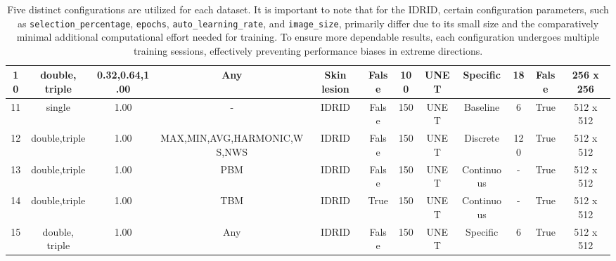\begin{table}[H]
{\begin{tabular}{|c|c|c|c|c|c|c|c|c|c|c|c|}
  10 & double, triple & 0.32,0.64,1.00 & Any                         & Skin lesion & False & 100 & UNET & Specific   & 18  & False & 256 x 256 \\ \hline
  11 & single         & 1.00           & -                           & IDRID       & False & 150 & UNET & Baseline   & 6   & True  & 512 x 512 \\ \hline
  12 & double,triple  & 1.00           & MAX,MIN,AVG,HARMONIC,WS,NWS & IDRID       & False & 150 & UNET & Discrete   & 120 & True  & 512 x 512 \\ \hline
  13 & double,triple  & 1.00           & PBM                         & IDRID       & False & 150 & UNET & Continuous & -   & True  & 512 x 512 \\ \hline
  14 & double,triple  & 1.00           & TBM                         & IDRID       & True  & 150 & UNET & Continuous & -   & True  & 512 x 512 \\ \hline
  15 & double, triple & 1.00           & Any                         & IDRID       & False & 150 & UNET & Specific   & 6   & True  & 512 x 512 \\ \hline
  \end{tabular}%
  }
  \caption[Final Configuration List]{Five distinct configurations are utilized for each dataset. It is important to note that for the \acf{IDRID}, certain configuration parameters, such as \texttt{selection\_percentage}, \texttt{epochs}, \texttt{auto\_learning\_rate}, and \texttt{image\_size}, primarily differ due to its small size and the comparatively minimal additional computational effort needed for training. To ensure more dependable results, each configuration undergoes multiple training sessions, effectively preventing performance biases in extreme directions.}
  \label{tab:final_configuration_list}
  \end{table}